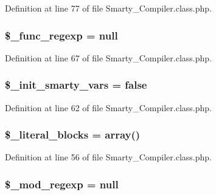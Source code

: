 \-Definition at line 77 of file \-Smarty\-\_\-\-Compiler.\-class.\-php.

\hypertarget{class_smarty___compiler_af61216a1435e5a41b5b572360aeb7f80}{
\subsubsection[{\$\-\_\-func\-\_\-regexp}]{\setlength{\rightskip}{0pt plus 5cm}\$\-\_\-func\-\_\-regexp = null}}\label{class_smarty___compiler_af61216a1435e5a41b5b572360aeb7f80}


\-Definition at line 67 of file \-Smarty\-\_\-\-Compiler.\-class.\-php.

\hypertarget{class_smarty___compiler_aeff0dc90f88a8159fc26365ada4b9c7f}{
\subsubsection[{\$\-\_\-init\-\_\-smarty\-\_\-vars}]{\setlength{\rightskip}{0pt plus 5cm}\$\-\_\-init\-\_\-smarty\-\_\-vars = false}}\label{class_smarty___compiler_aeff0dc90f88a8159fc26365ada4b9c7f}


\-Definition at line 62 of file \-Smarty\-\_\-\-Compiler.\-class.\-php.

\hypertarget{class_smarty___compiler_ab4cc9376b47cdd08a6cd3ce4e68809c1}{
\subsubsection[{\$\-\_\-literal\-\_\-blocks}]{\setlength{\rightskip}{0pt plus 5cm}\$\-\_\-literal\-\_\-blocks = array()}}\label{class_smarty___compiler_ab4cc9376b47cdd08a6cd3ce4e68809c1}


\-Definition at line 56 of file \-Smarty\-\_\-\-Compiler.\-class.\-php.

\hypertarget{class_smarty___compiler_a0e1eb9b85190cec7f65061062e3158cf}{
\subsubsection[{\$\-\_\-mod\-\_\-regexp}]{\setlength{\rightskip}{0pt plus 5cm}\$\-\_\-mod\-\_\-regexp = null}}\label{class_smarty___compiler_a0e1eb9b85190cec7f65061062e3158cf}


